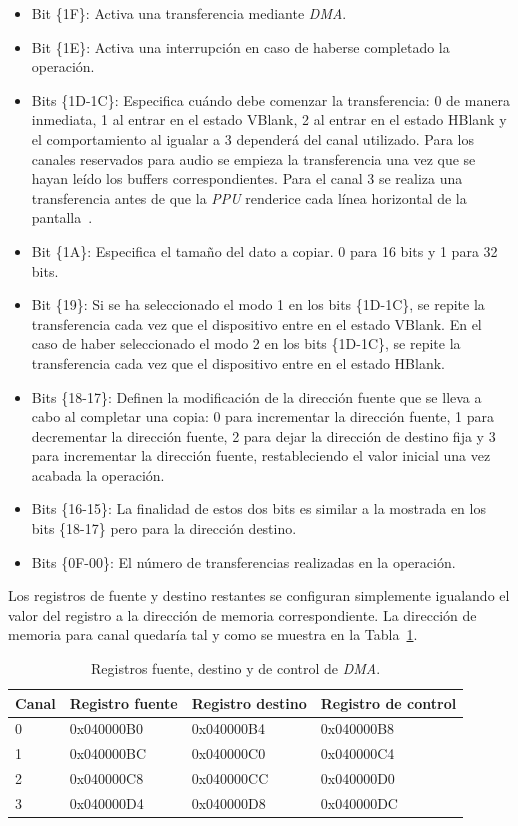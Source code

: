 \begin{itemize}
	\item Bit \{1F\}: Activa una transferencia mediante \textit{DMA}.
	\item Bit \{1E\}: Activa una interrupción en caso de haberse completado la operación. 
	\item Bits \{1D-1C\}: Especifica cuándo debe comenzar la transferencia: 0 de manera inmediata, 1 al entrar en el estado VBlank, 2 al entrar en el estado HBlank y el comportamiento al igualar a 3 dependerá del canal utilizado. Para los canales reservados para audio se empieza la transferencia una vez que se hayan leído los buffers correspondientes. Para el canal 3 se realiza una transferencia antes de que la \textit{PPU} renderice cada línea horizontal de la pantalla~\cite{bib:tonc}.
	\item Bit \{1A\}: Especifica el tamaño del dato a copiar. 0 para 16 bits y 1 para 32 bits. 
	\item Bit \{19\}: Si se ha seleccionado el modo 1 en los bits \{1D-1C\}, se repite la transferencia cada vez que el dispositivo entre en el estado VBlank. En el caso de haber seleccionado el modo 2 en los bits \{1D-1C\}, se repite la transferencia cada vez que el dispositivo entre en el estado HBlank.
	\item Bits \{18-17\}: Definen la modificación de la dirección fuente que se lleva a cabo al completar una copia: 0 para incrementar la dirección fuente, 1 para decrementar la dirección fuente, 2 para dejar la dirección de destino fija y 3 para incrementar la dirección fuente, restableciendo el valor inicial una vez acabada la operación. 
	\item Bits \{16-15\}: La finalidad de estos dos bits es similar a la mostrada en los bits \{18-17\} pero para la dirección destino.
	\item Bits \{0F-00\}: El número de transferencias realizadas en la operación.
\end{itemize}

Los registros de fuente y destino restantes se configuran simplemente igualando el valor del registro a la dirección de memoria correspondiente. La dirección de memoria para canal quedaría tal y como se muestra en la Tabla~\ref{tab:dma}.

\begin{table}[h]
	\centering
	\begin{tabular}{| l | l | l | l |}
		\hline
		\textbf{Canal} & \textbf{Registro fuente} & \textbf{Registro destino} & \textbf{Registro de control}  \\ \hline
		0 &  0x040000B0 & 0x040000B4 & 0x040000B8 \\ \hline
		1 &  0x040000BC & 0x040000C0 & 0x040000C4 \\ \hline
		2 &  0x040000C8 & 0x040000CC & 0x040000D0 \\ \hline
		3 &  0x040000D4 & 0x040000D8 & 0x040000DC \\ \hline
	\end{tabular}
	\caption{Registros fuente, destino y de control de \textit{DMA}.}\label{tab:dma}
\end{table}
\FloatBarrier{}

